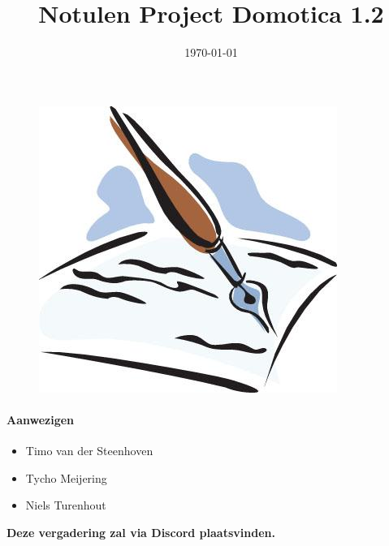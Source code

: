 \documentclass[11pt]{article}
\title{Notulen Project Domotica 1.2}
\date{\today} %
\begin{document}
\thispagestyle{empty}
\maketitle %
\begin{figure}[h]
	\includegraphics[width=\textwidth]{notulen}
	\date{} %
\end{figure}
\newpage
\paragraph{Aanwezigen}
\begin{itemize}
	\item Timo van der Steenhoven
	\item Tycho Meijering
	\item Niels Turenhout
\end{itemize}
\textbf{Deze vergadering zal via Discord plaatsvinden.}
\end{document}

